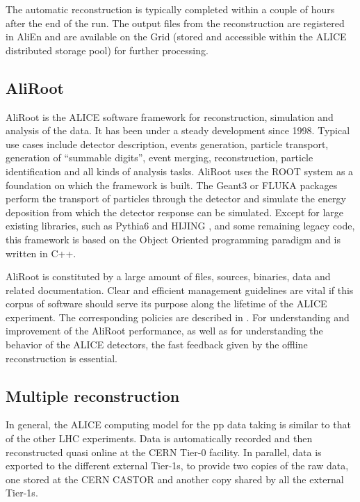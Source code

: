 The automatic reconstruction is typically completed within a couple
of hours after the end of the run. The output files from the
reconstruction are registered in AliEn and are available on the Grid
(stored and accessible within the ALICE distributed storage pool)
for further processing.

\subsection{AliRoot}
%
AliRoot \cite{AliRoot} is the ALICE software framework for reconstruction, simulation and
analysis of the data. It has been under a steady
development since 1998. Typical use cases include detector
description, events generation, particle transport, generation of
``summable digits'', event merging, reconstruction, particle
identification and all kinds of analysis tasks. AliRoot uses the
ROOT system as a foundation on which the framework is built. The Geant3 \cite{GEANT3} or
FLUKA \cite{FLUKA} packages perform the transport of particles through the
detector and simulate the energy deposition from which the detector
response can be simulated. Except for large existing libraries, such
as Pythia6 \cite{pythia} and HIJING \cite{hijing}, and some remaining legacy code,
this framework is based on the Object Oriented programming paradigm
and is written in C++.

AliRoot is constituted by a large amount of files, sources,
binaries, data and related documentation. Clear and efficient
management guidelines are vital if this corpus of software should
serve its purpose along the lifetime of the ALICE experiment. The
corresponding policies are described in \cite{ALICE_POLICY}.  For understanding and
improvement of the AliRoot performance, as well as for understanding
the behavior of the ALICE detectors, the fast feedback given by the
offline reconstruction is essential.

\subsection{Multiple reconstruction}
%
In general, the ALICE computing model for the pp data taking is
similar to that of the other LHC experiments. Data is automatically
recorded and then reconstructed quasi online at the CERN Tier-0
facility. In parallel, data is exported to the different external
Tier-1s, to provide two copies of the raw data, one stored at the
CERN CASTOR and another copy shared by all the external Tier-1s.

